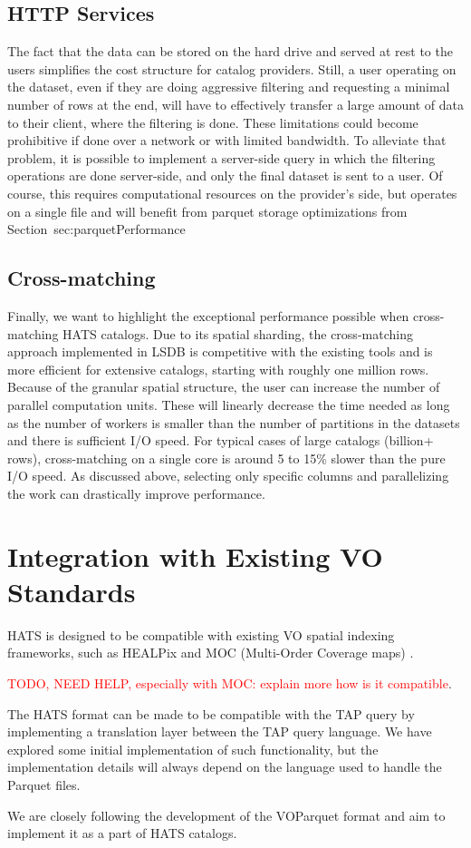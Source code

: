 \documentclass[11pt,a4paper]{ivoa}
\begin{document}
\subsection{HTTP Services}
The fact that the data can be stored on the hard drive and served at rest to the users simplifies the cost structure for catalog providers. 
Still, a user operating on the dataset, even if they are doing aggressive filtering and requesting a minimal number of rows at the end, will have to effectively transfer a large amount of data to their client, where the filtering is done. 
These limitations could become prohibitive if done over a network or with limited bandwidth. 
To alleviate that problem, it is possible to implement a server-side query in which the filtering operations are done server-side, and only the final dataset is sent to a user. 
Of course, this requires computational resources on the provider's side, but operates on a single file and will benefit from parquet storage optimizations from Section~{sec:parquetPerformance}

\subsection{Cross-matching}
Finally, we want to highlight the exceptional performance possible when cross-matching HATS catalogs. 
Due to its spatial sharding, the cross-matching approach implemented in LSDB is competitive with the existing tools and is more efficient for extensive catalogs, starting with roughly one million rows. 
Because of the granular spatial structure, the user can increase the number of parallel computation units. 
These will linearly decrease the time needed as long as the number of workers is smaller than the number of partitions in the datasets and there is sufficient I/O speed. 
For typical cases of large catalogs (billion+ rows), cross-matching on a single core is around 5 to 15\% slower than the pure I/O speed. 
As discussed above, selecting only specific columns and parallelizing the work can drastically improve performance.   

\section{Integration with Existing VO Standards}
HATS is designed to be compatible with existing VO spatial indexing frameworks, such as HEALPix \citep{gorski:healpix} and MOC (Multi-Order Coverage maps) \citep{ivoa:MOC}. \par
\textcolor{red}{TODO, NEED HELP, especially with MOC: explain more how is it compatible}. \par 
The HATS format can be made to be compatible with the TAP query by implementing a translation layer between the TAP query language. 
We have explored some initial implementation of such functionality, but the implementation details will always depend on the language used to handle the Parquet files. \par
We are closely following the development of the VOParquet format and aim to implement it as a part of HATS catalogs.
\end{document}

